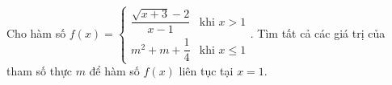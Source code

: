 \begin{ex}
Cho hàm số $f(x)=\begin{cases}\dfrac{\sqrt{x+3}-2}{x-1}&\text{khi }x>1\\m^2+m+\dfrac14&\text{khi }x\le1\end{cases}$. Tìm tất cả các giá trị của tham số thực $m$ để hàm số $f(x)$ liên tục tại $x=1$.
\end{ex}
